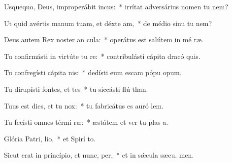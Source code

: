 \item Usquequo, Deus, improperábit incus:~* irrítat adversárius nomen tu  nem?
\item Ut quid avértis manum tuam, et déxte am,~* de médio sinu tu  nem?
\item Deus autem Rex noster an cula:~* operátus est salútem in mé ræ.
\item Tu confirmásti in virtúte tu re:~* contribulásti cápita dracó  quis.
\item Tu confregísti cápita nis:~* dedísti eum escam pópu opum.
\item Tu dirupísti fontes, et tes~* tu siccásti flú than.
\item Tuus est dies, et tu  nox:~* tu fabricátus es auró  lem.
\item Tu fecísti omnes térmi ræ:~* æstátem et ver tu plas a.
\item Glória Patri,  lio,~* et Spirí to.
\item Sicut erat in princípio, et nunc,  per,~* et in sǽcula sæcu. men.
